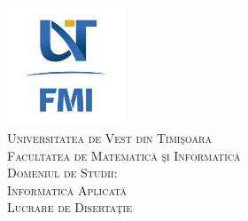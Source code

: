 \documentclass[12pt, a4paper]{report}
\begin{document}
\renewcommand{\abstractname}{Abstract}

\begin{titlepage}

	\newcommand{\HRule}{\rule{\linewidth}{0.5mm}} %

	\center %


	\vspace{-20pt}
	\includegraphics[width=100pt]{FMI-03.png}\\[1.0cm] %

	\textsc{\LARGE Universitatea de Vest din Timi\c{s}oara}\\[0.5cm] %
	\textsc{\Large Facultatea de Matematic\u{a} \c{s}i Informatic\u{a}}\\[0.5cm] %
	\textsc{\large Domeniul de Studii: \\Informatic\u{a} Aplicat\u{a}}\\[3cm] %


	\textsc{\Huge Lucrare de Diserta\c tie}\\[5cm]



\end{titlepage}
\end{document}
